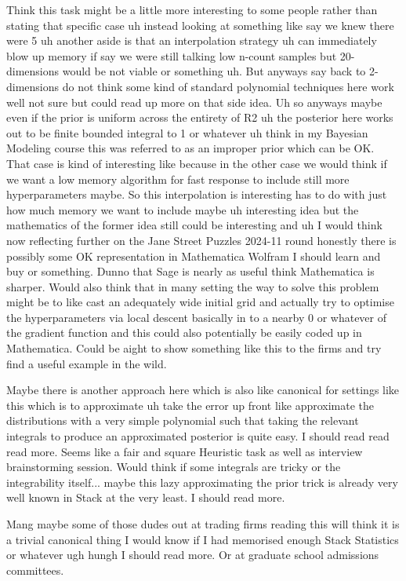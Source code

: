 Think this task might be a little more interesting to some people rather than stating that specific case uh instead looking at something like say we knew there were 5 uh another aside is that an interpolation strategy uh can immediately blow up memory if say we were still talking low n-count samples but 20-dimensions would be not viable or something uh. But anyways say back to 2-dimensions do not think some kind of standard polynomial techniques here work well not sure but could read up more on that side idea. Uh so anyways maybe even if the prior is uniform across the entirety of R2 uh the posterior here works out to be finite bounded integral to 1 or whatever uh think in my Bayesian Modeling course this was referred to as an improper prior which can be OK. That case is kind of interesting like because in the other case we would think if we want a low memory algorithm for fast response to include still more hyperparameters maybe. So this interpolation is interesting has to do with just how much memory we want to include maybe uh interesting idea but the mathematics of the former idea still could be interesting and uh I would think now reflecting further on the Jane Street Puzzles 2024-11 round honestly there is possibly some OK representation in Mathematica Wolfram I should learn and buy or something. Dunno that Sage is nearly as useful think Mathematica is sharper. Would also think that in many setting the way to solve this problem might be to like cast an adequately wide initial grid and actually try to optimise the hyperparameters via local descent basically in to a nearby 0 or whatever of the gradient function and this could also potentially be easily coded up in Mathematica. Could be aight to show something like this to the firms and try find a useful example in the wild.

Maybe there is another approach here which is also like canonical for settings like this which is to approximate uh take the error up front like approximate the distributions with a very simple polynomial such that taking the relevant integrals to produce an approximated posterior is quite easy. I should read read read more. Seems like a fair and square Heuristic task as well as interview brainstorming session. Would think if some integrals are tricky or the integrability itself... maybe this lazy approximating the prior trick is already very well known in Stack at the very least. I should read more.

Mang maybe some of those dudes out at trading firms reading this will think it is a trivial canonical thing I would know if I had memorised enough Stack Statistics or whatever ugh hungh I should read more. Or at graduate school admissions committees.


